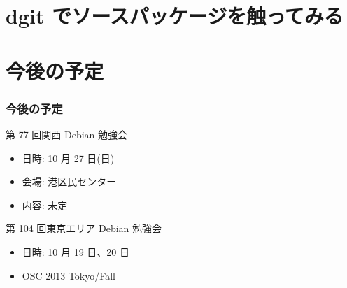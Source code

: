 \documentclass[cjk,dvipdfmx,10pt,compress,%
hyperref={bookmarks=true,bookmarksnumbered=true,bookmarksopen=false,%
colorlinks=false,%
pdftitle={第 76 回 関西 Debian 勉強会},%
pdfauthor={倉敷・のがた・佐々木・かわだ・八津尾},%
pdfsubject={資料},%
}]{beamer}
\begin{document}
\section{dgit でソースパッケージを触ってみる}


\section{今後の予定}
\begin{frame}[fragile]
\frametitle{今後の予定}

\begin{block}{第 77 回関西 Debian 勉強会}
  \begin{itemize}
  \item 日時: 10 月 27 日(日)
  \item 会場: 港区民センター
  \item 内容: 未定
  \end{itemize}
\end{block}

\begin{block}{第 104 回東京エリア Debian 勉強会}
  \begin{itemize}
  \item 日時: 10 月 19 日、20 日
  \item OSC 2013 Tokyo/Fall
  \end{itemize}
\end{block}

\end{frame}

\takahashi[50]{  }
\end{document}

